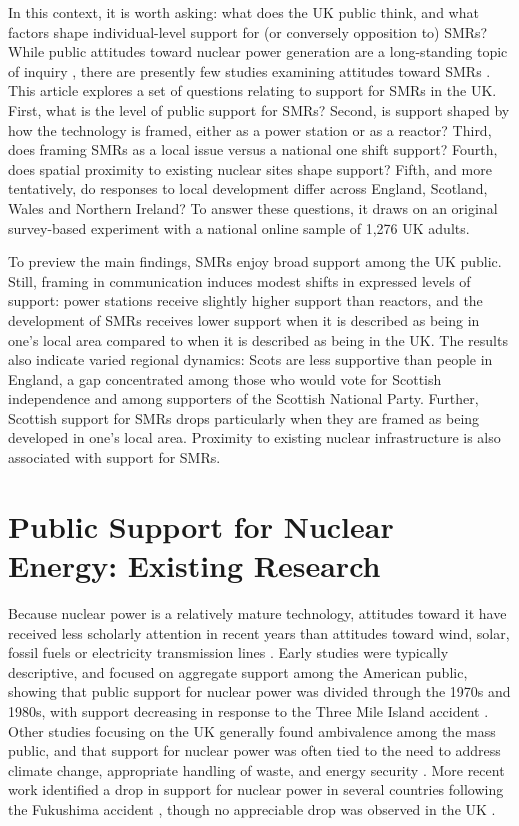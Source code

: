 \documentclass[a4paper, 11pt]{article}
\begin{document}
In this context, it is worth asking: what does the UK public think, and what factors shape individual-level support for (or conversely opposition to) SMRs? While public attitudes toward nuclear power generation are a long-standing topic of inquiry \citep{aina_poy2026,bickerstaff2008,corner2011,venables2012}, there are presently few studies examining attitudes toward SMRs \citep[but see][]{durdovic2025,jones2026,hlavacek2023,kiviluoma2025,osiolo2026}. This article explores a set of questions relating to support for SMRs in the UK. First, what is the level of public support for SMRs? Second, is support shaped by how the technology is framed, either as a power station or as a reactor? Third, does framing SMRs as a local issue versus a national one shift support? Fourth, does spatial proximity to existing nuclear sites shape support? Fifth, and more tentatively, do responses to local development differ across England, Scotland, Wales and Northern Ireland? To answer these questions, it draws on an original survey-based experiment \citep{druckman2022,mutz2011} with a national online sample of 1,276 UK adults.

To preview the main findings, SMRs enjoy broad support among the UK public. Still, framing in communication induces modest shifts in expressed levels of support: power stations receive slightly higher support than reactors, and the development of SMRs receives lower support when it is described as being in one's local area compared to when it is described as being in the UK. The results also indicate varied regional dynamics: Scots are less supportive than people in England, a gap concentrated among those who would vote for Scottish independence and among supporters of the Scottish National Party. Further, Scottish support for SMRs drops particularly when they are framed as being developed in one's local area. Proximity to existing nuclear infrastructure is also associated with support for SMRs.

\section{Public Support for Nuclear Energy: Existing Research}
Because nuclear power is a relatively mature technology, attitudes toward it have received less scholarly attention in recent years than attitudes toward wind, solar, fossil fuels or electricity transmission lines \citep{carley2020}. Early studies were typically descriptive, and focused on aggregate support among the American public, showing that public support for nuclear power was divided through the 1970s and 1980s, with support decreasing in response to the Three Mile Island accident \citep{freudenburg1985, rosa1994}. Other studies focusing on the UK generally found ambivalence among the mass public, and that support for nuclear power was often tied to the need to address climate change, appropriate handling of waste, and energy security \citep{bickerstaff2008,grovewhite2006,pidgeon2008,corner2011}. More recent work identified a drop in support for nuclear power in several countries following the Fukushima accident \citep{latre2017}, though no appreciable drop was observed in the UK \citep{jones2016}.
\end{document}
